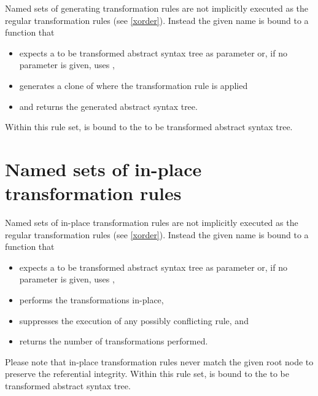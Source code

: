 Named sets of generating transformation rules are not implicitly
executed as the regular transformation rules (see \ref{xorder}). Instead the
given name is bound to a function that

\begin{itemize}
   \item expects a to be transformed abstract syntax tree
      as parameter or, if no parameter is given, uses ,
   \item generates a clone of  where the transformation
      rule is applied
   \item and returns the generated abstract syntax tree.
\end{itemize}

\noindent
Within this rule set,  is bound to the
to be transformed abstract syntax tree.

\begin{grammar}
      \produces {} 
	 \lextoken{\{} 
	 \lextoken{\}}
\end{grammar}

\section{Named sets of in-place transformation rules}
\label{named-inplace-trrules}

Named sets of in-place transformation rules are not implicitly executed
as the regular transformation rules (see \ref{xorder}). Instead the
given name is bound to a function that

\begin{itemize}
   \item expects a to be transformed abstract syntax tree
      as parameter or, if no parameter is given, uses ,
   \item performs the transformations in-place,
   \item suppresses the execution of any possibly conflicting rule, and
   \item returns the number of transformations performed.
\end{itemize}

Please note that in-place transformation rules never match the
given root node to preserve the referential integrity.
Within this rule set,  is bound to the
to be transformed abstract syntax tree.

\begin{grammar}
      \produces {}
	  
	  \nextline
	 \lextoken{\{} 
	 \lextoken{\}}
\end{grammar}

\endinput
